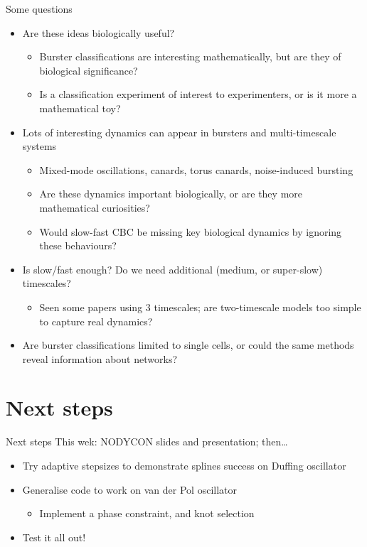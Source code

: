 \documentclass[presentation]{beamer}
\begin{document}
\begin{frame}[label={sec:orgd46e714},plain]{Some questions}
\begin{itemize}
\item Are these ideas biologically useful?
\begin{itemize}
\item Burster classifications are interesting mathematically, but are they of biological significance?
\item Is a classification experiment of interest to experimenters, or is it more a mathematical toy?
\end{itemize}
\item Lots of interesting dynamics can appear in bursters and multi-timescale systems
\begin{itemize}
\item Mixed-mode oscillations, canards, torus canards, noise-induced bursting
\item Are these dynamics important biologically, or are they more mathematical curiosities?
\item Would slow-fast CBC be missing key biological dynamics by ignoring these behaviours?
\end{itemize}
\item Is slow/fast enough? Do we need additional (medium, or super-slow) timescales?
\begin{itemize}
\item Seen some papers using 3 timescales; are two-timescale models too simple to capture real dynamics?
\end{itemize}
\item Are burster classifications limited to single cells, or could the same methods reveal information about networks?
\end{itemize}
\end{frame}

\section{Next steps}
\label{sec:org9c3cf24}
\begin{frame}[label={sec:org99391ee}]{Next steps}
This wek: NODYCON slides and presentation; then\ldots{}
\vfill
\begin{itemize}
\item Try adaptive stepsizes to demonstrate splines success on Duffing oscillator
\end{itemize}
\vfill
\begin{itemize}
\item Generalise code to work on van der Pol oscillator
\begin{itemize}
\item Implement a phase constraint, and knot selection
\end{itemize}
\end{itemize}
\vfill
\begin{itemize}
\item Test it all out!
\end{itemize}
\end{frame}
\end{document}
